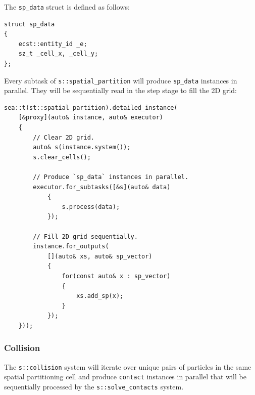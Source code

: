 \documentclass[oneside, 12pt, a4paper, openany]{book}
\begin{document}
The
\texttt{sp_data}
struct is defined as follows:

\begin{verbatim}
struct sp_data
{
    ecst::entity_id _e;
    sz_t _cell_x, _cell_y;
};
\end{verbatim}

Every subtask of
\texttt{s::spatial_partition}
will produce
\texttt{sp_data}
instances in parallel. They will be sequentially read in the step stage
to fill the 2D grid:

\begin{verbatim}
sea::t(st::spatial_partition).detailed_instance(
    [&proxy](auto& instance, auto& executor)
    {
        // Clear 2D grid.
        auto& s(instance.system());
        s.clear_cells();

        // Produce `sp_data` instances in parallel.
        executor.for_subtasks([&s](auto& data)
            {
                s.process(data);
            });

        // Fill 2D grid sequentially.
        instance.for_outputs(
            [](auto& xs, auto& sp_vector)
            {
                for(const auto& x : sp_vector)
                {
                    xs.add_sp(x);
                }
            });
    }));
\end{verbatim}

\subsubsection{Collision}\label{collision}

The
\texttt{s::collision}
system will iterate over unique pairs of particles in the same spatial
partitioning cell and produce
\texttt{contact}
instances in parallel that will be sequentially processed by the
\texttt{s::solve_contacts}
system.
\end{document}
